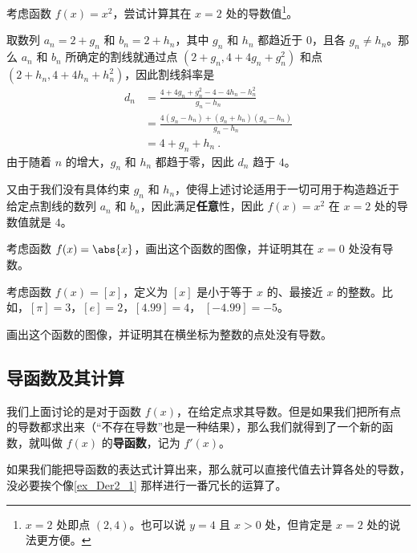 \begin{example}{}\label{ex_Der2_1}
考虑函数 $f(x)=x^2$，尝试计算其在 $x=2$ 处的导数值\footnote{$x=2$ 处即点 $(2, 4)$。也可以说 $y=4$ 且 $x>0$ 处，但肯定是 $x=2$ 处的说法更方便。}。

取数列 $a_n=2+g_n$ 和 $b_n=2+h_n$，其中 $g_n$ 和 $h_n$ 都趋近于 $0$，且各 $g_n\not=h_n$。那么 $a_n$ 和 $b_n$ 所确定的割线就通过点 $(2+g_n, 4+4g_n+g_n^2)$ 和点 $(2+h_n, 4+4h_n+h_n^2)$，因此割线斜率是
\begin{equation}
\begin{aligned}
d_n&=\frac{4+4g_n+g_n^2-4-4h_n-h_n^2}{g_n-h_n}\\
&=\frac{4(g_n-h_n)+(g_n+h_n)(g_n-h_n)}{g_n-h_n}\\
&=4+g_n+h_n~.
\end{aligned}
\end{equation}
由于随着 $n$ 的增大，$g_n$ 和 $h_n$ 都趋于零，因此 $d_n$ 趋于 $4$。

又由于我们没有具体约束 $g_n$ 和 $h_n$，使得上述讨论适用于一切可用于构造趋近于给定点割线的数列 $a_n$ 和 $b_n$，因此满足\textbf{任意}性，因此 $f(x)=x^2$ 在 $x=2$ 处的导数值就是 $4$。
\end{example}

\begin{exercise}{}
考虑函数 $f(x)=\abs{x}$，画出这个函数的图像，并证明其在 $x=0$ 处没有导数。
\end{exercise}

\begin{exercise}{}\label{exe_Der2_1}
考虑函数 $f(x)=[x]$，定义为 $[x]$ 是小于等于 $x$ 的、最接近 $x$ 的整数。比如，$[\pi]=3$，$[e]=2$，$[4.99]=4$， $[-4.99]=-5$。

画出这个函数的图像，并证明其在横坐标为整数的点处没有导数。
\end{exercise}








\subsection{导函数及其计算}

我们上面讨论的是对于函数 $f(x)$，在给定点求其导数。但是如果我们把所有点的导数都求出来（“不存在导数”也是一种结果），那么我们就得到了一个新的函数，就叫做 $f(x)$ 的\textbf{导函数}，记为 $f'(x)$。

如果我们能把导函数的表达式计算出来，那么就可以直接代值去计算各处的导数，没必要挨个像\autoref{ex_Der2_1} 那样进行一番冗长的运算了。

